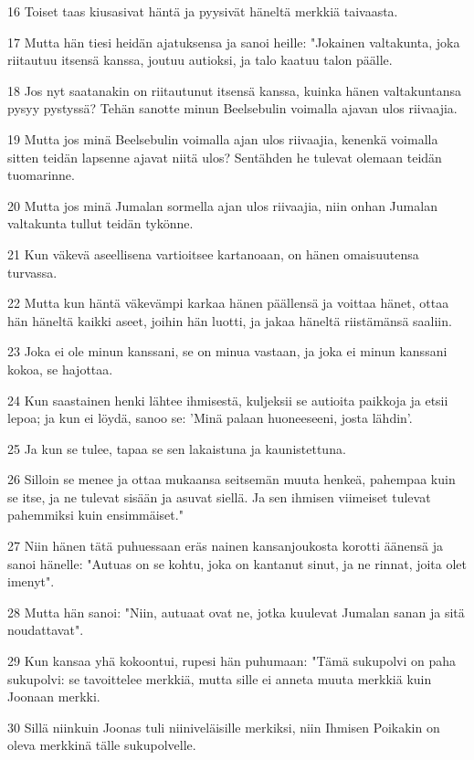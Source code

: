 \par 16 Toiset taas kiusasivat häntä ja pyysivät häneltä merkkiä taivaasta.
\par 17 Mutta hän tiesi heidän ajatuksensa ja sanoi heille: "Jokainen valtakunta, joka riitautuu itsensä kanssa, joutuu autioksi, ja talo kaatuu talon päälle.
\par 18 Jos nyt saatanakin on riitautunut itsensä kanssa, kuinka hänen valtakuntansa pysyy pystyssä? Tehän sanotte minun Beelsebulin voimalla ajavan ulos riivaajia.
\par 19 Mutta jos minä Beelsebulin voimalla ajan ulos riivaajia, kenenkä voimalla sitten teidän lapsenne ajavat niitä ulos? Sentähden he tulevat olemaan teidän tuomarinne.
\par 20 Mutta jos minä Jumalan sormella ajan ulos riivaajia, niin onhan Jumalan valtakunta tullut teidän tykönne.
\par 21 Kun väkevä aseellisena vartioitsee kartanoaan, on hänen omaisuutensa turvassa.
\par 22 Mutta kun häntä väkevämpi karkaa hänen päällensä ja voittaa hänet, ottaa hän häneltä kaikki aseet, joihin hän luotti, ja jakaa häneltä riistämänsä saaliin.
\par 23 Joka ei ole minun kanssani, se on minua vastaan, ja joka ei minun kanssani kokoa, se hajottaa.
\par 24 Kun saastainen henki lähtee ihmisestä, kuljeksii se autioita paikkoja ja etsii lepoa; ja kun ei löydä, sanoo se: 'Minä palaan huoneeseeni, josta lähdin'.
\par 25 Ja kun se tulee, tapaa se sen lakaistuna ja kaunistettuna.
\par 26 Silloin se menee ja ottaa mukaansa seitsemän muuta henkeä, pahempaa kuin se itse, ja ne tulevat sisään ja asuvat siellä. Ja sen ihmisen viimeiset tulevat pahemmiksi kuin ensimmäiset."
\par 27 Niin hänen tätä puhuessaan eräs nainen kansanjoukosta korotti äänensä ja sanoi hänelle: "Autuas on se kohtu, joka on kantanut sinut, ja ne rinnat, joita olet imenyt".
\par 28 Mutta hän sanoi: "Niin, autuaat ovat ne, jotka kuulevat Jumalan sanan ja sitä noudattavat".
\par 29 Kun kansaa yhä kokoontui, rupesi hän puhumaan: "Tämä sukupolvi on paha sukupolvi: se tavoittelee merkkiä, mutta sille ei anneta muuta merkkiä kuin Joonaan merkki.
\par 30 Sillä niinkuin Joonas tuli niiniveläisille merkiksi, niin Ihmisen Poikakin on oleva merkkinä tälle sukupolvelle.
